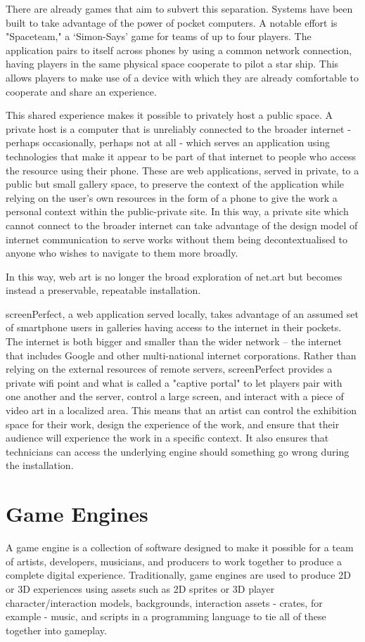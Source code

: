 There are already games that aim to subvert this separation. Systems have been built to take advantage of the power of pocket computers. A notable effort is "Spaceteam," \parencite{spaceteam} a ‘Simon-Says' game for teams of up to four players. The application pairs to itself across phones by using a common network connection, having players in the same physical space cooperate to pilot a star ship. This allows players to make use of a device with which they are already comfortable to cooperate and share an experience.

This shared experience makes it possible to privately host a public space. A private host is a computer that is unreliably connected to the broader internet - perhaps occasionally, perhaps not at all - which serves an application using technologies that make it appear to be part of that internet to people who access the resource using their phone. These are web applications, served in private, to a public but small gallery space, to preserve the context of the application while relying on the user's own resources in the form of a phone to give the work a personal context within the public-private site. In this way, a private site which cannot connect to the broader internet can take advantage of the design model of internet communication to serve works without them being decontextualised to anyone who wishes to navigate to them more broadly.

In this way, web art is no longer the broad exploration of net.art but becomes instead a preservable, repeatable installation.

screenPerfect, a web application served locally, takes advantage of an assumed set of smartphone users in galleries having access to the internet in their pockets. The internet is both bigger and smaller than the wider network – the internet that includes Google and other multi-national internet corporations. Rather than relying on the external resources of remote servers, screenPerfect provides a private wifi point and what is called a "captive portal" to let players pair with one another and the server, control a large screen, and interact with a piece of video art in a localized area. This means that an artist can control the exhibition space for their work, design the experience of the work, and ensure that their audience will experience the work in a specific context. It also ensures that technicians can access the underlying engine should something go wrong during the installation.

\section{Game Engines}
A game engine is a collection of software designed to make it possible for a team of artists, developers, musicians, and producers to work together to produce a complete digital experience. Traditionally, game engines are used to produce 2D or 3D experiences using assets such as 2D sprites or 3D player character/interaction models, backgrounds, interaction assets - crates, for example - music, and scripts in a programming language to tie all of these together into gameplay. 

